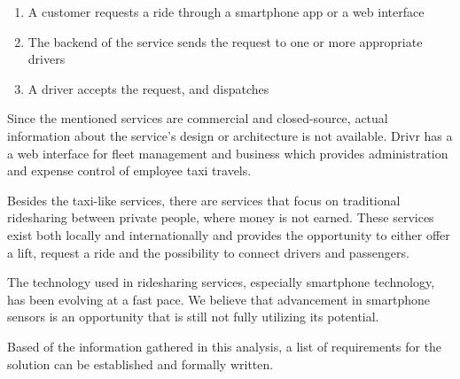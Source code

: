 \begin{enumerate}
	\item A customer requests a ride through a smartphone app or a web interface
	\item The backend of the service sends the request to one or more appropriate drivers
	\item A driver accepts the request, and dispatches
\end{enumerate}

Since the mentioned services are commercial and closed-source, actual information about the service's design or architecture is not available.
Drivr has a a web interface for fleet management and business which provides administration and expense control of employee taxi travels.

Besides the taxi-like services, there are services that focus on traditional ridesharing between private people, where money is not earned.
These services exist both locally and internationally and provides the opportunity to either offer a lift, request a ride and the possibility to connect drivers and passengers.



The technology used in ridesharing services, especially smartphone technology, has been evolving at a fast pace.\cite{fastCOMPUTERPHONES}
We believe that advancement in smartphone sensors is an opportunity that is still not fully utilizing its potential.

Based of the information gathered in this analysis, a list of requirements for the solution can be established and formally written.